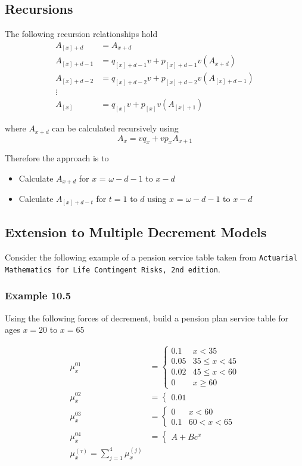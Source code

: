 \documentclass{article}
\begin{document}
\subsection{Recursions}
The following recursion relationships hold
\begin{align*}
A_{[x]+d} &= A_{x+d} \\
A_{[x]+d-1} &= q_{[x]+d-1}v + p_{[x]+d-1}v(A_{x+d}) \\
A_{[x]+d-2} &= q_{[x]+d-2}v + p_{[x]+d-2}v(A_{[x]+d-1}) \\
\vdots \\
A_{[x]} &= q_{[x]}v + p_{[x]}v(A_{[x]+1})
\end{align*}

where $A_{x+d}$ can be calculated recursively using
\begin{equation}
A_{x} = vq_{x} + vp_{x}A_{x+1}
\end{equation}

Therefore the approach is to 
\begin{itemize}
\item Calculate $A_{x+d}$ for $x$ = $\omega - d - 1$ to $x - d$
\item Calculate $A_{[x]+d-t}$ for $t = 1$ to $d$ using $x$ = $\omega - d - 1$ to $x - d$
\end{itemize}

\subsection{Extension to Multiple Decrement Models}

Consider the following example of a pension service table taken from \texttt{Actuarial Mathematics for Life Contingent Risks, 2nd edition}.

\subsubsection*{Example 10.5}
Using the following forces of decrement, build a pension plan service table for ages $x = 20$ to $x = 65$

\begin{align*}
\mu_{x}^{01} &= \begin{cases} 0.1 & x < 35 \\ 0.05 & 35 \leq x < 45 \\ 0.02 & 45 \leq x < 60 \\ 0 & x \geq 60 \end{cases} \\
\mu_{x}^{02} &= \begin{cases} 0.01 \end{cases}\\
\mu_{x}^{03} &= \begin{cases} 0 & x < 60 \\ 0.1 & 60 < x < 65 \end{cases}\\ 
\mu_{x}^{04} &= \begin{cases} A + Bc^{x} \end{cases} \\
\mu_{x}^{(\tau)} = \sum_{j=1}^{4} \mu_{x}^{(j)} 
\end{align*}
\end{document}

